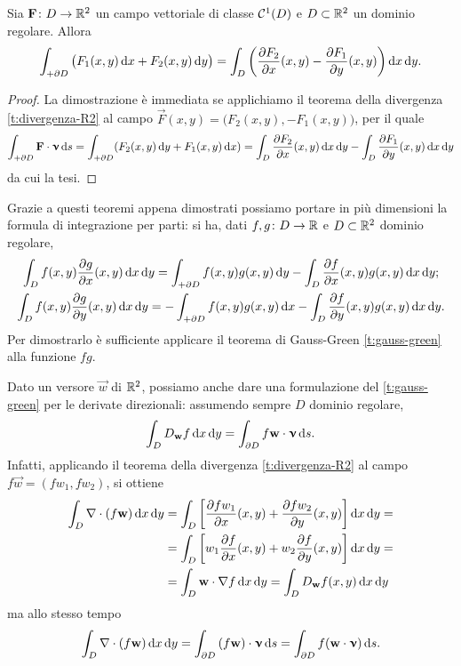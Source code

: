 \begin{teorema} \label{t:rotore-R2}
	Sia $\mathbf{F}\colon D\to\mathbb{R}^2$ un campo vettoriale di classe $\mathcal{C}^{{1}}(D)$ e $D\subset\mathbb{R}^2$ un dominio regolare.
	Allora
	\begin{equation}
		\int_{+\partial D}\big(F_1(x,y)\,\textup{d} x+F_2(x,y)\,\textup{d} y\big)=\int_D\bigg(\frac{\partial {F_2}}{\partial {x}}(x,y)-\frac{\partial {F_1}}{\partial {y}}(x,y)\bigg)\,\textup{d} x\,\textup{d} y.
		\label{eq:rotore-R2}
	\end{equation}
\end{teorema}
\begin{proof}
	La dimostrazione è immediata se applichiamo il teorema della divergenza \ref{t:divergenza-R2} al campo $\vec F(x,y)=\big(F_2(x,y),-F_1(x,y)\big)$, per il quale
	\begin{equation}
		\int_{+\partial D}{\mathbf{F}}\cdot{\bm{\upnu}}\,\textup{d} s=\int_{+\partial D}(F_2(x,y)\,\textup{d} y+F_1(x,y)\,\textup{d} x)=\int_D\frac{\partial {F_2}}{\partial {x}}(x,y)\,\textup{d} x\,\textup{d} y-\int_D\frac{\partial {F_1}}{\partial {y}}(x,y)\,\textup{d} x\,\textup{d} y
	\end{equation}
	da cui la tesi.
\end{proof}
Grazie a questi teoremi appena dimostrati possiamo portare in più dimensioni la formula di integrazione per parti: si ha, dati $f,g\colon D\to\mathbb{R}$ e $D\subset\mathbb{R}^2$ dominio regolare,
\begin{gather}
	\int_D f(x,y)\frac{\partial {g}}{\partial {x}}(x,y)\,\textup{d} x\,\textup{d} y=\int_{+\partial D}f(x,y)g(x,y)\,\textup{d} y-\int_D\frac{\partial {f}}{\partial {x}}(x,y)g(x,y)\,\textup{d} x\,\textup{d} y;\\
	\int_D f(x,y)\frac{\partial {g}}{\partial {y}}(x,y)\,\textup{d} x\,\textup{d} y=-\int_{+\partial D}f(x,y)g(x,y)\,\textup{d} x-\int_D\frac{\partial {f}}{\partial {y}}(x,y)g(x,y)\,\textup{d} x\,\textup{d} y.
\end{gather}
Per dimostrarlo è sufficiente applicare il teorema di Gauss-Green \ref{t:gauss-green} alla funzione $fg$.

Dato un versore $\vec w$ di $\mathbb{R}^2$, possiamo anche dare una formulazione del \ref{t:gauss-green} per le derivate direzionali: assumendo sempre $D$ dominio regolare,
\begin{equation}
	\int_DD_{\mathbf{w}}f\,\textup{d} x\,\textup{d} y=\int_{\partial D}f{\mathbf{w}}\cdot{\bm{\upnu}}\,\textup{d} s.
\end{equation}
Infatti, applicando il teorema della divergenza \ref{t:divergenza-R2} al campo $f\vec w=(fw_1,fw_2)$, si ottiene
\begin{equation}
	\begin{split}
		\int_D\nabla\cdot(f\mathbf{w})\,\textup{d} x\,\textup{d} y&=\int_D\bigg[\frac{\partial {fw_1}}{\partial {x}}(x,y)+\frac{\partial {fw_2}}{\partial {y}}(x,y)\bigg]\,\textup{d} x\,\textup{d} y=\\
		&=\int_D\bigg[w_1\frac{\partial {f}}{\partial {x}}(x,y)+w_2\frac{\partial {f}}{\partial {y}}(x,y)\bigg]\,\textup{d} x\,\textup{d} y=\\
		&=\int_D{\mathbf{w}}\cdot{\nabla f}\,\textup{d} x\,\textup{d} y=\int_DD_{\mathbf{w}}f(x,y)\,\textup{d} x\,\textup{d} y
	\end{split}
\end{equation}
ma allo stesso tempo
\begin{equation}
	\int_D\nabla\cdot(f\mathbf{w})\,\textup{d} x\,\textup{d} y=\int_{\partial D}{(f\mathbf{w})}\cdot{\bm{\upnu}}\,\textup{d} s=\int_{\partial D}f({\mathbf{w}}\cdot{\bm{\upnu}})\,\textup{d} s.
\end{equation}

